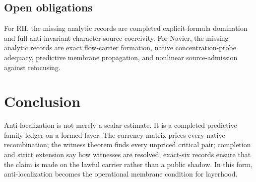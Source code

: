 \documentclass[11pt]{article}
\begin{document}
\subsection{Open obligations}
For RH, the missing analytic records are completed explicit-formula domination and full anti-invariant character-source coercivity.  For Navier, the missing analytic records are exact flow-carrier formation, native concentration-probe adequacy, predictive membrane propagation, and nonlinear source-admission against refocusing.

\section{Conclusion}
Anti-localization is not merely a scalar estimate.  It is a completed predictive family ledger on a formed layer.  The currency matrix prices every native recombination; the witness theorem finds every unpriced critical pair; completion and strict extension say how witnesses are resolved; exact-six records ensure that the claim is made on the lawful carrier rather than a public shadow.  In this form, anti-localization becomes the operational membrane condition for layerhood.
\end{document}
